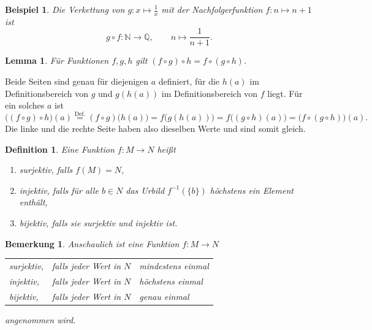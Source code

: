 \documentclass[a4paper]{article}
\makeatletter
\theoremstyle{kurzskript}
\newtheorem{definition}[satz]{Definition}
\newtheorem{lemma}[satz]{Lemma}
\newtheorem*{bsp}{Beispiel}
\newtheorem*{bem}{Bemerkung}
\renewenvironment{proof}[1][\proofname]{\par\pushQED{\qed}%
  \normalfont\topsep\medskipamount\relax
  \trivlist\item[\hskip\labelsep\bfseries #1\@addpunct{.}]\ignorespaces}%
  {\popQED\endtrivlist\@endpefalse}
\renewcommand{\proofname}{Beweis}
\newcommand{\N}{\mathbb{N}}
\newcommand{\Q}{\mathbb{Q}}
\makeatother
\begin{document}
\begin{bsp}
Die Verkettung von $g\colon x \mapsto \frac1x$ mit der Nachfolgerfunktion $f\colon n \mapsto n + 1$ ist
\[
  g \circ f\colon \N \to \Q, \qquad n \mapsto \frac{1}{n+1}.
\]
\end{bsp}

\begin{lemma}
Für Funktionen $f, g, h$ gilt $(f \circ g) \circ h = f \circ (g \circ h)$.
\end{lemma}

\begin{proof}
Beide Seiten sind genau für diejenigen $a$ definiert, für die $h(a)$ im Definitionsbereich von $g$ und $g(h(a))$ im Definitionsbereich von $f$ liegt. Für ein solches $a$ ist
\[
  \bigl((f \circ g) \circ h\bigr)(a) \overset{\text{Def.}}{=} (f \circ g)\bigl(h(a)\bigr) = f\bigl(g(h(a))\bigr) = f\bigl((g \circ h)(a)\bigr) = \bigl(f \circ (g \circ h)\bigr)(a).
\]
Die linke und die rechte Seite haben also dieselben Werte und sind somit gleich.
\end{proof}

\begin{definition}
Eine Funktion $f\colon M \to N$ heißt
\begin{enumerate}[label=(\arabic*)]
  \item \emph{surjektiv}, falls $f(M) = N$,
  \item \emph{injektiv}, falls für alle $b \in N$ das Urbild $f^{-1}(\{b\})$ höchstens ein Element enthält,
  \item \emph{bijektiv}, falls sie surjektiv und injektiv ist.
\end{enumerate}
\end{definition}

\begin{bem}
Anschaulich ist eine Funktion $f\colon M \to N$
\begin{center}
\begin{tabular}{lll}
surjektiv, & falls jeder Wert in $N$ & \emph{mindestens} einmal \\
injektiv,  & falls jeder Wert in $N$ & \emph{höchstens} einmal \\
bijektiv,  & falls jeder Wert in $N$ & \emph{genau} einmal
\end{tabular}
\end{center}
angenommen wird.
\end{bem}
\end{document}
